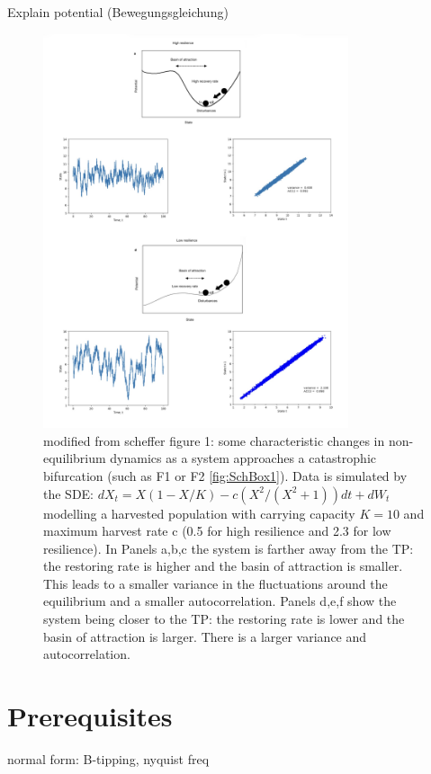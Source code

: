 \documentclass[%
thesis=student,%
coverpage=false,%
titlepage=false,%
headmarks=true, %
german,%
font=libertine, %
math=newpxtx, %
BCOR=5mm,%
coverBCOR=11mm%
]{tumbook}
\begin{document}
Explain potential (Bewegungsgleichung)



\begin{figure}[h]
    \centering
    \includegraphics[width=0.8\textwidth]{bachelor-thesis/figures/scheffer_fig1_reimp_v1.jpg}
    \caption{modified from scheffer figure 1: some characteristic changes in non-equilibrium dynamics as a system approaches a catastrophic bifurcation (such as F1 or F2 \ref{fig:SchBox1}). Data is simulated by the SDE: $dX_{t}=X(1-X/K)-c(X^2/(X^2+1))dt + dW_{t}$ modelling a harvested population with carrying capacity $K = 10$ and maximum harvest rate c (0.5 for high resilience and 2.3 for low resilience). In Panels a,b,c the system is farther away from the TP: the restoring rate is higher and the basin of attraction is smaller. This leads to a smaller variance in the fluctuations around the equilibrium and a smaller autocorrelation. Panels d,e,f show the system being closer to the TP: the restoring rate is lower and the basin of attraction is larger. There is a larger variance and autocorrelation.}
    \label{fig:enter-label}
\end{figure}



\chapter{Prerequisites}
normal form: B-tipping, nyquist freq
\end{document}
